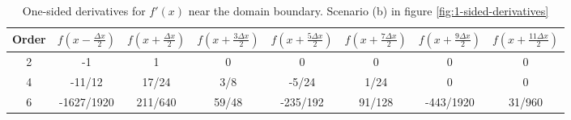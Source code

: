 \begin{table}[h]
  \centering
  \footnotesize
  \begin{tabular}{cccccccc}
    Order & $f\left(x - \frac{\Delta x}{2}\right)$ & $f\left(x + \frac{\Delta x}{2}\right)$ & $f\left(x + \frac{3\Delta x}{2}\right)$ & $f\left(x + \frac{5\Delta x}{2}\right)$ & $f\left(x + \frac{7\Delta x}{2}\right)$ & $f\left(x + \frac{9\Delta x}{2}\right)$ & $f\left(x + \frac{11\Delta x}{2}\right)$ \\ \hline
    2 & -1 & 1 & 0 & 0 & 0 & 0 & 0 \\ \hline
    4 & -11/12 & 17/24 & 3/8 & -5/24 & 1/24 & 0 & 0 \\ \hline
    6 & -1627/1920 & 211/640 & 59/48 & -235/192 & 91/128 & -443/1920 & 31/960 \\ \hline
  \end{tabular}
  \caption[One-sided derivatives part 2]{One-sided derivatives for $f'(x)$ near the domain
    boundary. Scenario (b) in figure \ref{fig:1-sided-derivatives}}
  \label{tab:1-sided-b}
\end{table}



